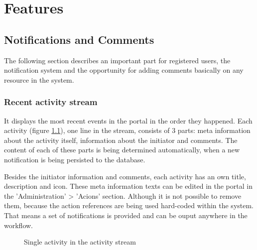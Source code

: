 \chapter{Features}\label{chap:features}

\section{Notifications and Comments}

The following section describes an important part for registered users, the notification system and the opportunity for adding comments basically on any resource in the system.

\subsection{Recent activity stream}
It displays the most recent events in the portal in the order they happened. Each activity (figure \ref{fig:activity-stream-single-activity}), one line in the stream, consists of 3 parts: meta information about the activity itself, information about the initiator and comments. The content of each of these parts is being determined automatically, when a new notification is being persisted to the database.

Besides the initiator information and comments, each activity has an own title, description and icon. These meta information texts can be edited in the portal in the 'Administration' > 'Acions' section. Although it is not possible to remove them, because the action references are being used hard-coded within the system. That means a set of notifications is provided and can be ouput anywhere in the workflow.

\begin{figure}[!h]
  \centering
  \caption{Single activity in the activity stream}
  \label{fig:activity-stream-single-activity}
\end{figure}

